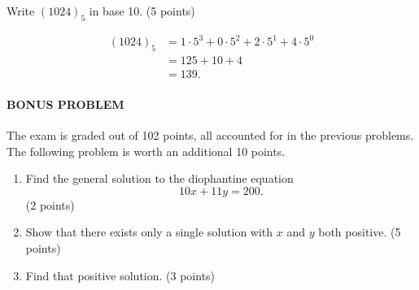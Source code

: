 \documentclass[12pt]{rudin}
\begin{document}
\begin{Exercise}
    Write $(1024)_5$ in base 10. (5 points)
\end{Exercise}

\begin{Answer}
    \begin{align*}
        (1024)_5 &= 1 \cdot 5^3 + 0 \cdot 5^2 + 2 \cdot 5^1 + 4 \cdot 5^0 \\
                 &= 125 + 10 + 4 \\
                 &= 139.
    \end{align*}
\end{Answer}

\paragraph{BONUS PROBLEM} The exam is graded out of 102 points, all accounted
for in the previous problems. The following problem is worth an additional 10
points.

\begin{Exercise}
    \begin{enumerate}[label=(\textbf{\alph*})]
        \item Find the general solution to the diophantine equation
            \begin{equation*}
                10x + 11y = 200.
            \end{equation*}
            (2 points)

        \item Show that there exists only a single solution with $x$ and $y$
            both positive. (5 points)

        \item Find that positive solution. (3 points)
    \end{enumerate}
\end{Exercise}
\end{document}
